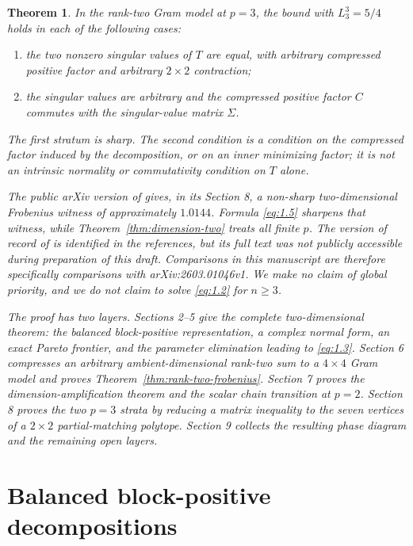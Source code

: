 \documentclass[11pt]{article}
\newtheorem{theorem}{Theorem}[section]
\begin{document}
\begin{theorem}
\label{thm:cubic-strata}
In the rank-two Gram model at $p=3$, the bound with
$L_3^3=5/4$ holds in each of the following cases:

\begin{enumerate}
\item the two nonzero singular values of $T$ are equal, with arbitrary compressed
positive factor and arbitrary $2\times2$ contraction;
\item the singular values are arbitrary and the compressed positive factor $C$
commutes with the singular-value matrix $\Sigma$.

\end{enumerate}

The first stratum is sharp. The second condition is a condition on the compressed
factor induced by the decomposition, or on an inner minimizing factor; it is not
an intrinsic normality or commutativity condition on $T$ alone.

The public arXiv version of \cite{zhang} gives, in its Section 8, a non-sharp
two-dimensional Frobenius witness of approximately $1.0144$. Formula \eqref{eq:1.5}
sharpens that witness, while Theorem~\ref{thm:dimension-two} treats all finite $p$. The version of
record of \cite{zhang} is identified in the references, but its full text was not publicly
accessible during preparation of this draft. Comparisons in this manuscript are
therefore specifically comparisons with arXiv:2603.01046v1. We make no claim of
global priority, and we do not claim to solve \eqref{eq:1.2} for $n\ge3$.

The proof has two layers. Sections 2--5 give the complete two-dimensional theorem:
the balanced block-positive representation, a complex normal form, an exact Pareto
frontier, and the parameter elimination leading to \eqref{eq:1.3}. Section 6 compresses an
arbitrary ambient-dimensional rank-two sum to a $4\times4$ Gram model and proves
Theorem~\ref{thm:rank-two-frobenius}. Section 7 proves the dimension-amplification theorem and the scalar
chain transition at $p=2$. Section 8 proves the two $p=3$ strata by reducing a
matrix inequality to the seven vertices of a $2\times2$ partial-matching polytope.
Section 9 collects the resulting phase diagram and the remaining open layers.

\end{theorem}

\section{Balanced block-positive decompositions}
\end{document}
